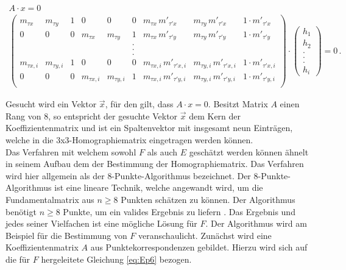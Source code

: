 \begin{gather}
		A\cdot x = 0\\
	\begin{pmatrix}
		m_{\tau x}&m_{\tau y}&1&0&0&0&m_{\tau x}\, m'_{\tau' x}&m_{\tau y} \,m'_{\tau'x} & 1\cdot m'_{\tau'x}\\
		0&0&0&m_{\tau x}&m_{\tau y}&1&m_{\tau x}\, m'_{\tau' y}&m_{\tau y}\, m'_{\tau'y} & 1\cdot m'_{\tau'y}\\
		&&&&&.&&&\\	
		&&&&&.&&&\\	
		&&&&&.&&&\\	
		m_{\tau x,i}&m_{\tau y,i}&1&0&0&0&m_{\tau x,i}\, m'_{\tau'x,i}&m_{\tau y,i}\, m'_{\tau'x,i} & 1\cdot m'_{\tau'x,i}\\
		0&0&0&m_{\tau x,i}&m_{\tau y,i}&1&m_{\tau x,i}\, m'_{\tau'y,i}&m_{\tau y,i}\, m'_{\tau'y,i} & 1\cdot m'_{\tau'y,i}\\
	\end{pmatrix}
	\cdot
	\begin{pmatrix}
		h_1\\h_2\\.\\.\\.\\h_i
	\end{pmatrix}
	=0 \, .
\end{gather}

Gesucht wird ein Vektor $\vec{x}$, für den gilt, dass $A \cdot x = 0$. Besitzt Matrix $A$ einen Rang von 8, so entspricht der gesuchte Vektor $\vec{x}$ dem Kern der Koeffizientenmatrix und ist ein Spaltenvektor mit insgesamt neun Einträgen, welche in die 3x3-Homographiematrix eingetragen werden können\cite{HZ,Schwarz}.\\


Das Verfahren mit welchem sowohl $F$ als auch $E$ geschätzt werden können ähnelt in seinem Aufbau dem der Bestimmung der Homographiematrix. Das Verfahren wird hier allgemein als der 8-Punkte-Algorithmus bezeichnet\cite{HZ,Ferid,Zhang2014}. Der 8-Punkte-Algorithmus ist eine lineare Technik, welche angewandt wird, um die Fundamentalmatrix aus  $n \geq 8$ Punkten schätzen zu können. Der Algorithmus benötigt $n \geq 8$ Punkte, um ein valides Ergebnis zu liefern \cite{HZ,Zhang2014,Ferid}. Das Ergebnis und jedes seiner Vielfachen ist eine mögliche Lösung für $F$. Der Algorithmus wird am Beispiel für die Bestimmung von $F$ veranschaulicht. Zunächst wird eine Koeffizientenmatrix $A$ aus Punktekorrespondenzen gebildet. Hierzu wird sich auf die für $F$ hergeleitete Gleichung \ref{eq:Ep6} bezogen.


